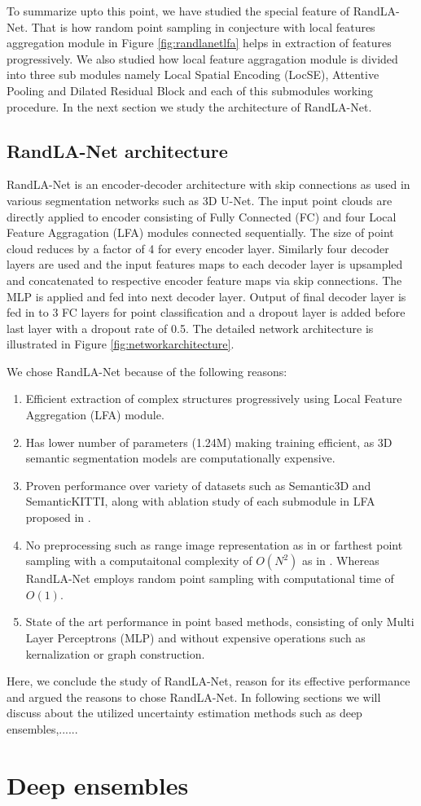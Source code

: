 To summarize upto this point, we have studied the special feature of RandLA-Net. That is how random point sampling in conjecture with local features aggregation module in Figure \ref{fig:randlanetlfa} helps in extraction of features progressively.
We also studied how local feature aggragation module is divided into three sub modules namely Local Spatial Encoding (LocSE), Attentive Pooling and Dilated Residual Block and each of this submodules working procedure.
In the next section we study the architecture of RandLA-Net.

\subsection{RandLA-Net architecture}
RandLA-Net is an encoder-decoder architecture with skip connections as used in various segmentation networks such as 3D U-Net\cite{wang2018two_3DUnet}.
The input point clouds are directly applied to encoder consisting of Fully Connected (FC) and four Local Feature Aggragation (LFA) modules connected sequentially.
The size of point cloud reduces by a factor of 4 for every encoder layer. 
Similarly four decoder layers are used and the input features maps to each decoder layer is upsampled and concatenated to respective encoder feature maps via skip connections.
The MLP is applied and fed into next decoder layer.
Output of final decoder layer is fed in to 3 FC layers for point classification and a dropout layer is added before last layer with a dropout rate of 0.5.
The detailed network architecture is illustrated in Figure \ref{fig:networkarchitecture}.


We chose RandLA-Net because of the following reasons:
\begin{enumerate}
    \item Efficient extraction of complex structures progressively using Local Feature Aggregation (LFA) module.
    \item Has lower number of parameters (1.24M) making training efficient, as 3D semantic segmentation models are computationally expensive.
    \item Proven performance over variety of datasets such as Semantic3D and SemanticKITTI, along with ablation study of each submodule in LFA proposed in \cite{Hu_2020_CVPR_Randla}.
    \item No preprocessing such as range image representation as in \cite{Milioto2019} or farthest point sampling with a computaitonal complexity of $O(N^2)$ as in \cite{Qi_2017_CVPR_pointnet}. Whereas RandLA-Net employs random point sampling with computational time of $O(1)$.
    \item State of the art performance in point based methods, consisting of only Multi Layer Perceptrons (MLP) and without expensive operations such as kernalization or graph construction.
\end{enumerate}

Here, we conclude the study of RandLA-Net, reason for its effective performance and argued the reasons to chose RandLA-Net.
In following sections we will discuss about the utilized uncertainty estimation methods such as deep ensembles,......
\section{Deep ensembles}

